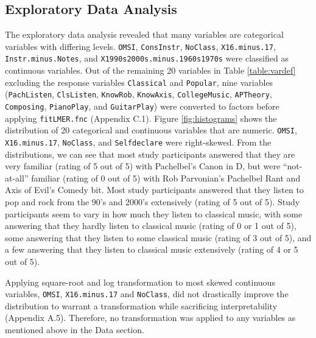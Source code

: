 \documentclass{article}
\begin{document}
\subsection{Exploratory Data Analysis}

The exploratory data analysis revealed that many variables are categorical variables with differing levels. \texttt{OMSI}, \texttt{ConsInstr}, \texttt{NoClass}, \texttt{X16.minus.17}, \texttt{Instr.minus.Notes}, and \texttt{X1990s2000s.minus.1960s1970s} were classified as continuous variables. Out of the remaining 20 variables in Table \ref{table:vardef} excluding the response variables \texttt{Classical} and \texttt{Popular}, nine variables (\texttt{PachListen}, \texttt{ClsListen}, \texttt{KnowRob}, \texttt{KnowAxis}, \texttt{CollegeMusic}, \texttt{APTheory}, \texttt{Composing}, \texttt{PianoPlay}, and \texttt{GuitarPlay}) were converted to factors before applying \texttt{fitLMER.fnc} (Appendix C.1). Figure \ref{fig:histograms} shows the distribution of 20 categorical and continuous variables that are numeric. \texttt{OMSI}, \texttt{X16.minus.17}, \texttt{NoClass}, and \texttt{Selfdeclare} were right-skewed. From the distributions, we can see that most study participants answered that they are very familiar (rating of 5 out of 5) with Pachelbel's Canon in D, but were ``not-at-all'' familiar (rating of 0 out of 5) with Rob Parvonian's Pachelbel Rant and Axis of Evil's Comedy bit. Most study participants answered that they listen to pop and rock from the 90's and 2000's extensively (rating of 5 out of 5). Study participants seem to vary in how much they listen to classical music, with some answering that they hardly listen to classical music (rating of 0 or 1 out of 5), some answering that they listen to some classical music (rating of 3 out of 5), and a few answering that they listen to classical music extensively (rating of 4 or 5 out of 5).

\bigbreak

Applying square-root and log transformation to most skewed continuous variables, \texttt{OMSI}, \texttt{X16.minus.17} and \texttt{NoClass}, did not drastically improve the distribution to warrant a transformation while sacrificing interpretability (Appendix A.5). Therefore, no transformation was applied to any variables as mentioned above in the Data section.
\end{document}
